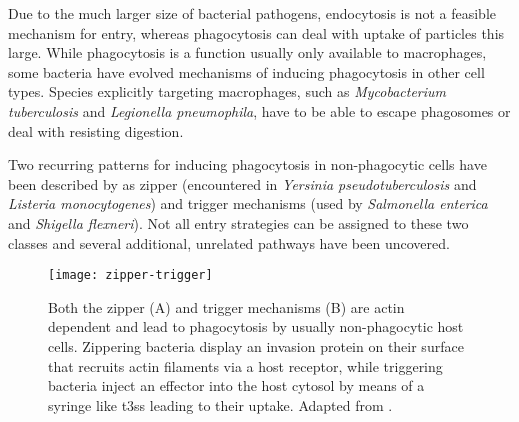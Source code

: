 Due to the much larger size of bacterial pathogens, endocytosis is not a feasible mechanism for entry, whereas phagocytosis can deal with uptake of particles this large. While phagocytosis is a function usually only available to macrophages, some bacteria have evolved mechanisms of inducing phagocytosis in other cell types. Species explicitly targeting macrophages, such as \textit{Mycobacterium tuberculosis} and \textit{Legionella pneumophila}, have to be able to escape phagosomes or deal with resisting digestion.

Two recurring patterns for inducing phagocytosis in non-phagocytic cells have been described by \citet{Cossart2004} as zipper (encountered in \textit{Yersinia pseudotuberculosis} and \textit{Listeria monocytogenes}) and trigger mechanisms (used by \textit{Salmonella enterica} and \textit{Shigella flexneri}). Not all entry strategies can be assigned to these two classes and several additional, unrelated pathways have been uncovered.

\begin{figure}
  \centering
  \texttt{[image: zipper-trigger]}
  \caption[Zipper and trigger mechanisms for bacterial host-cell entry]{Both the zipper (A) and trigger mechanisms (B) are actin dependent and lead to phagocytosis by usually non-phagocytic host cells. Zippering bacteria display an invasion protein on their surface that recruits actin filaments via a host receptor, while triggering bacteria inject an effector into the host cytosol by means of a syringe like \acrlong{t3ss} leading to their uptake. Adapted from \citet{Haglund2011}.}
  \label{fig:zipper-trigger}
\end{figure}

\label{zipper-mechanism}

